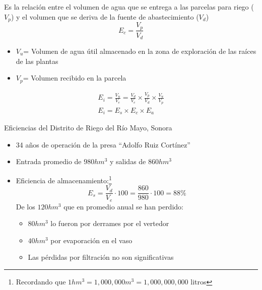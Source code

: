\begin{definition}
    Es la relación entre el volumen de agua que se entrega a las parcelas para riego ($V_p$) y el volumen que se deriva de la fuente de abastecimiento ($V_d$)
    \begin{equation}
        E_c = \frac{V_p}{V_d}
    \end{equation}
    \begin{notation}
        \begin{itemize}
            \item $V_u$= Volumen de agua útil almacenado en la zona de exploración de las raíces de las plantas
            \item $V_p$= Volumen recibido en la parcela
        \end{itemize}
    \end{notation}
\end{definition}
\begin{align*}
    E_i = \frac{V_u}{V_e} = \frac{V_d}{V_e} \times \frac{V_p}{V_d} \times \frac{V_u}{V_p}\\
    E_i = E_s \times E_c \times E_a
\end{align*}
\begin{example}
    Eficiencias del Distrito de Riego del Río Mayo, Sonora

    \begin{itemize}
        \item 34 años de operación de la presa ``Adolfo Ruiz Cortínez''
        \item Entrada promedio de $980hm^3$ y salidas de $860 hm^3$
        \item Eficiencia de almacenamiento:\footnote{Recordando que $1hm^3=1,000,000m^3=1,000,000,000$ litros} \begin{equation*}
            E_s = \frac{V_d}{V_e} \cdot 100 = \frac{860}{980} \cdot 100 = 88\%
        \end{equation*}
        De los $120 hm^3$ que en promedio anual se han perdido: \begin{itemize}
            \item $80 hm^3$ lo fueron por derrames por el vertedor
            \item $40hm^3$ por evaporación en el vaso
            \item Las pérdidas por filtración no son significativas
        \end{itemize}
    \end{itemize}
\end{example}

